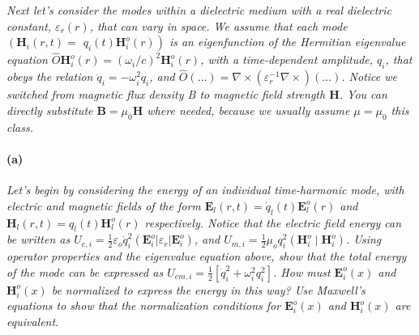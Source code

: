 \documentclass[hyperref, a4paper]{article}
\begin{document}
\textit{Next let's consider the modes within a dielectric medium with a real dielectric constant, $\varepsilon_r(r)$, that can vary in space. We assume that each mode $\left(\mathbf{H}_i(r, t)=\right.$ $\left.q_i(t) \mathbf{H}_i^o(r)\right)$ is an eigenfunction of the Hermitian eigenvalue equation $\hat{O} \mathbf{H}_i^o(r)=\left(\omega_i / c\right)^2 \mathbf{H}_i^o(r)$, with a time-dependent amplitude, $q_i$, that obeys the relation $\ddot{q}_i=-\omega_i^2 q_i$, and $\hat{O}(\ldots)=\nabla \times\left(\varepsilon_r^{-1} \nabla \times\right)(\ldots)$. Notice we switched from magnetic flux density B to magnetic field strength $\mathbf{H}$. You can directly substitute $\mathbf{B}=\mu_0 \mathbf{H}$ where needed, because we usually assume $\mu=\mu_0$ this class.}

\paragraph*{(a)} \textit{Let's begin by considering the energy of an individual time-harmonic mode, with electric and magnetic fields of the form $\mathbf{E}_l(r, t)=\dot{q}_l(t) \mathbf{E}_l^o(r)$ and $\mathbf{H}_l(r, t)=q_l(t) \mathbf{H}_l^o(r)$ respectively. Notice that the electric field energy can be written as $U_{e, i}=\frac{1}{2} \varepsilon_o \dot{q}_i^2\left(\mathbf{E}_i^o\left|\varepsilon_r\right| \mathbf{E}_i^o\right)$, and $U_{m, i}=\frac{1}{2} \mu_o q_i^2\left(\mathbf{H}_i^o \mid \mathbf{H}_i^o\right)$. Using operator properties and the eigenvalue equation above, show that the total energy of the mode can be expressed as $U_{e m, i}=\frac{1}{2}\left[\dot{q}_i^2+\omega_i^2 q_i^2\right]$. How must $\mathbf{E}_i^o(x)$ and $\mathbf{H}_i^o(x)$ be normalized to express the energy in this way? Use Maxwell's equations to show that the normalization conditions for $\mathbf{E}_i^o(x)$ and $\mathbf{H}_i^o(x)$ are equivalent.}
\end{document}
